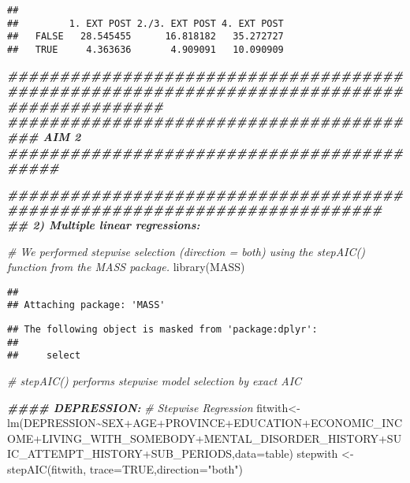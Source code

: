 \documentclass[
]{book}
\newenvironment{Shaded}{\begin{snugshade}}{\end{snugshade}}
\newcommand{\AttributeTok}[1]{\textcolor[rgb]{0.77,0.63,0.00}{#1}}
\newcommand{\CommentTok}[1]{\textcolor[rgb]{0.56,0.35,0.01}{\textit{#1}}}
\newcommand{\ConstantTok}[1]{\textcolor[rgb]{0.00,0.00,0.00}{#1}}
\newcommand{\DocumentationTok}[1]{\textcolor[rgb]{0.56,0.35,0.01}{\textbf{\textit{#1}}}}
\newcommand{\FunctionTok}[1]{\textcolor[rgb]{0.00,0.00,0.00}{#1}}
\newcommand{\NormalTok}[1]{#1}
\newcommand{\OtherTok}[1]{\textcolor[rgb]{0.56,0.35,0.01}{#1}}
\newcommand{\SpecialCharTok}[1]{\textcolor[rgb]{0.00,0.00,0.00}{#1}}
\newcommand{\StringTok}[1]{\textcolor[rgb]{0.31,0.60,0.02}{#1}}
\begin{document}
\begin{verbatim}
##        
##         1. EXT POST 2./3. EXT POST 4. EXT POST
##   FALSE   28.545455      16.818182   35.272727
##   TRUE     4.363636       4.909091   10.090909
\end{verbatim}

\begin{Shaded}
\begin{Highlighting}[]
\DocumentationTok{\#\#\#\#\#\#\#\#\#\#\#\#\#\#\#\#\#\#\#\#\#\#\#\#\#\#\#\#\#\#\#\#\#\#\#\#\#\#\#\#\#\#\#\#\#\#\#\#\#\#\#\#\#\#\#\#\#\#\#\#\#\#\#\#\#\#\#\#\#\#\#\#\#\#\#\#\#\#\#\#\#\#\#\#\#\#\#\#\#\#\#}
\DocumentationTok{\#\#\#\#\#\#\#\#\#\#\#\#\#\#\#\#\#\#\#\#\#\#\#\#\#\#\#\#\#\#\#\#\#\#\#\#\#\#\#\#\# AIM 2 \#\#\#\#\#\#\#\#\#\#\#\#\#\#\#\#\#\#\#\#\#\#\#\#\#\#\#\#\#\#\#\#\#\#\#\#\#\#\#\#\#\#\#}

\DocumentationTok{\#\#\#\#\#\#\#\#\#\#\#\#\#\#\#\#\#\#\#\#\#\#\#\#\#\#\#\#\#\#\#\#\#\#\#\#\#\#\#\#\#\#\#\#\#\#\#\#\#\#\#\#\#\#\#\#\#\#\#\#\#\#\#\#\#\#\#\#\#\#\#\#\#\#}
\DocumentationTok{\#\# 2) Multiple linear regressions:}

\CommentTok{\# We performed stepwise selection (direction = both) using the stepAIC() function from the MASS package.}
\FunctionTok{library}\NormalTok{(MASS)}
\end{Highlighting}
\end{Shaded}

\begin{verbatim}
## 
## Attaching package: 'MASS'
\end{verbatim}

\begin{verbatim}
## The following object is masked from 'package:dplyr':
## 
##     select
\end{verbatim}

\begin{Shaded}
\begin{Highlighting}[]
\CommentTok{\# stepAIC() performs stepwise model selection by exact AIC}


\DocumentationTok{\#\#\#\# DEPRESSION:}
\CommentTok{\# Stepwise Regression}
\NormalTok{fitwith}\OtherTok{\textless{}{-}}\FunctionTok{lm}\NormalTok{(DEPRESSION}\SpecialCharTok{\textasciitilde{}}\NormalTok{SEX}\SpecialCharTok{+}\NormalTok{AGE}\SpecialCharTok{+}\NormalTok{PROVINCE}\SpecialCharTok{+}\NormalTok{EDUCATION}\SpecialCharTok{+}\NormalTok{ECONOMIC\_INCOME}\SpecialCharTok{+}\NormalTok{LIVING\_WITH\_SOMEBODY}\SpecialCharTok{+}\NormalTok{MENTAL\_DISORDER\_HISTORY}\SpecialCharTok{+}\NormalTok{SUIC\_ATTEMPT\_HISTORY}\SpecialCharTok{+}\NormalTok{SUB\_PERIODS,}\AttributeTok{data=}\NormalTok{table)}
\NormalTok{stepwith }\OtherTok{\textless{}{-}} \FunctionTok{stepAIC}\NormalTok{(fitwith, }\AttributeTok{trace=}\ConstantTok{TRUE}\NormalTok{,}\AttributeTok{direction=}\StringTok{"both"}\NormalTok{)}
\end{Highlighting}
\end{Shaded}
\end{document}
